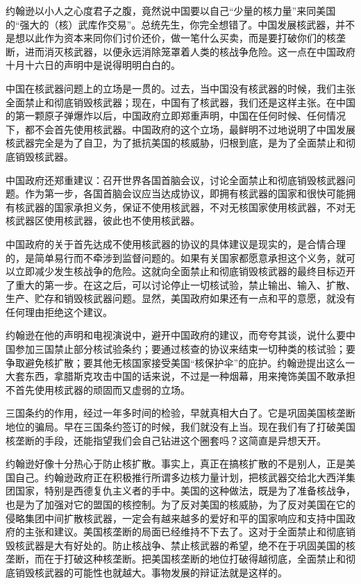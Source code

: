 约翰逊以小人之心度君子之腹，竟然说中国要以自己“少量的核力量”来同美国的“强大的（核）武库作交易”。总统先生，你完全想错了。中国发展核武器，并不是想以此作为资本来同你们讨价还价，做一笔什么买卖，而是要打破你们的核垄断，进而消灭核武器，以便永远消除笼罩着人类的核战争危险。这一点在中国政府十月十六日的声明中是说得明明白白的。

中国在核武器问题上的立场是一贯的。过去，当中国没有核武器的时候，我们主张全面禁止和彻底销毁核武器；现在，中国有了核武器，我们还是这样主张。在中国的第一颗原子弹爆炸以后，中国政府立即郑重声明，中国在任何时候、任何情况下，都不会首先使用核武器。中国政府的这个立场，最鲜明不过地说明了中国发展核武器完全是为了自卫，为了抵抗美国的核威胁，归根到底，是为了全面禁止和彻底销毁核武器。

中国政府还郑重建议：召开世界各国首脑会议，讨论全面禁止和彻底销毁核武器问题。作为第一步，各国首脑会议应当达成协议，即拥有核武器的国家和很快可能拥有核武器的国家承担义务，保证不使用核武器，不对无核国家使用核武器，不对无核武器区使用核武器，彼此也不使用核武器。

中国政府的关于首先达成不使用核武器的协议的具体建议是现实的，是合情合理的，是简单易行而不牵涉到监督问题的。如果有关国家都愿意承担这个义务，就可以立即减少发生核战争的危险。这就向全面禁止和彻底销毁核武器的最终目标迈开了重大的第一步。在这之后，可以讨论停止一切核试验，禁止输出、输入、扩散、生产、贮存和销毁核武器问题。显然，美国政府如果还有一点和平的意愿，就没有任何理由拒绝这个建议。

约翰逊在他的声明和电视演说中，避开中国政府的建议，而夸夸其谈，说什么要中国参加三国禁止部分核试验条约；要通过核查的协议来结束一切种类的核试验；要争取避免核扩散；要其他无核国家接受美国“核保护伞”的庇护。约翰逊提出这么一大套东西，拿腊斯克攻击中国的话来说，不过是一种烟幕，用来掩饰美国不敢承担不首先使用核武器的顽固而又虚弱的立场。

三国条约的作用，经过一年多时间的检验，早就真相大白了。它是巩固美国核垄断地位的骗局。早在三国条约签订的时候，我们就没有上当。现在我们有了打破美国核垄断的手段，还能指望我们会自己钻进这个圈套吗？这简直是异想天开。

约翰逊好像十分热心于防止核扩散。事实上，真正在搞核扩散的不是别人，正是美国自己。约翰逊政府正在积极推行所谓多边核力量计划，把核武器交给北大西洋集团国家，特别是西德复仇主义者的手中。美国的这种做法，既是为了准备核战争，也是为了加强对它的盟国的核控制。为了反对美国的核威胁，为了反对美国在它的侵略集团中间扩散核武器，一定会有越来越多的爱好和平的国家响应和支持中国政府的主张和建议。美国核垄断的局面已经维持不下去了。这对于全面禁止和彻底销毁核武器是大有好处的。防止核战争、禁止核武器的希望，绝不在于巩固美国的核垄断，而在于打破这种核垄断。把美国核垄断的地位打破得越彻底，全面禁止和彻底销毁核武器的可能性也就越大。事物发展的辩证法就是这样的。

